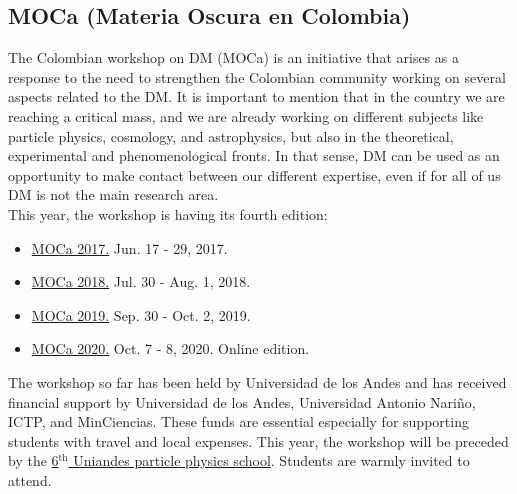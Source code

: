 \documentclass[a4paper,11pt]{article}
\begin{document}
\subsection*{MOCa (Materia Oscura en Colombia)}
The Colombian workshop on DM (MOCa) is an initiative that arises as a response  to the need to strengthen the Colombian community working on several aspects related to the DM. It is important to mention that in the country we are reaching a critical mass, and we are already working on different subjects like particle physics, cosmology, and astrophysics, but also in the theoretical, experimental and phenomenological fronts. In that sense, DM can be used as an opportunity to make contact between our different expertise, even if for all of us DM is not the main research area.\\
This year, the workshop is having its fourth edition:
\begin{itemize}
\item \href{https://forero.github.io/MOCA/}{MOCa 2017.}
Jun. 17 - 29, 2017. %
%
\item
\href{https://indico.cern.ch/e/moca2018}{MOCa 2018.}
Jul. 30 - Aug. 1, 2018. %
%
\item
\href{https://indico.cern.ch/e/moca2019}{MOCa 2019.}
Sep. 30 - Oct. 2, 2019. %
%
\item
\href{https://indico.cern.ch/e/moca2020}{MOCa 2020.}
Oct. 7 - 8, 2020. Online edition.
\end{itemize}
%
The workshop so far has been held by Universidad de los Andes and has received financial support by Universidad de los Andes, Universidad Antonio Nariño, ICTP, and MinCiencias. These funds are essential especially for supporting students with travel and local expenses.
This year, the workshop will be preceded by the \href{https://fisindico.uniandes.edu.co/event/18/}{6$^\text{th}$ Uniandes particle physics school}. Students are warmly invited to attend.
\end{document}
